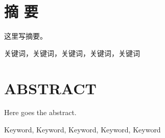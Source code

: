 
\chapter*{\textbf{\songti 摘 \qquad 要}}
\thispagestyle{noheader}
{}

这里写摘要。\zhlipsum[1-4] %

\bigskip %

关键词，关键词，关键词，关键词，关键词


\chapter*{\textbf{ABSTRACT}}
\thispagestyle{noheader}
{}

Here goes the abstract. \lipsum[1-5] %

\bigskip %

Keyword, Keyword, Keyword, Keyword, Keyword
